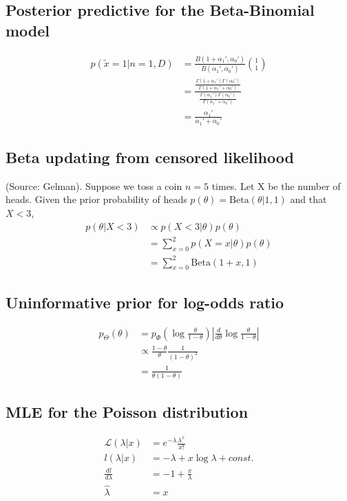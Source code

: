 \documentclass{article}
\begin{document}
\subsection{Posterior predictive for the Beta-Binomial model}
\begin{align*}
p(\tilde{x}=1|n=1,D) &= \frac{B(1+\alpha_1', \alpha_0')}{B(\alpha_1',\alpha_0')} {1\choose 1}\\
&= \frac{\frac{\Gamma(1+\alpha_1')\Gamma(\alpha_0')}{\Gamma(1+\alpha_1'+\alpha_0')}} {\frac{\Gamma(\alpha_1')\Gamma(\alpha_0')}{\Gamma(\alpha_1'+\alpha_0')}}\\
&= \frac{\alpha_1'}{\alpha_1'+\alpha_0'}
\end{align*}

\subsection{Beta updating from censored likelihood}
(Source: Gelman). Suppose we toss a coin $n=5$ times. Let X be the number of heads. Given the prior probability of heads $p(\theta) = \mathrm{Beta}(\theta|1,1)$ and that $X<3$,
\begin{align*}
p(\theta|X<3) &\propto p(X<3|\theta)p(\theta)\\
&= \sum_{x=0}^2 p(X=x|\theta)p(\theta)\\
&= \sum_{x=0}^2 \mathrm{Beta}(1+x,1)
\end{align*}

\subsection{Uninformative prior for log-odds ratio}
\begin{align*}
p_\Theta(\theta) &= p_\Phi\left(\log\frac{\theta}{1-\theta}\right) \left|\frac{d}{d\theta}\log\frac{\theta}{1-\theta}\right|\\
&\propto \frac{1-\theta}{\theta} \frac{1}{(1-\theta)^2}\\
&= \frac{1}{\theta(1-\theta)}
\end{align*}

\subsection{MLE for the Poisson distribution}
\begin{align*}
\mathcal{L}(\lambda|x) &= e^{-\lambda}\frac{\lambda^x}{x!}\\
l(\lambda|x) &= -\lambda + x\log\lambda + const.\\
\frac{dl}{d\lambda} &= -1 + \frac{x}{\lambda}\\
\hat\lambda &= x
\end{align*}
\end{document}
